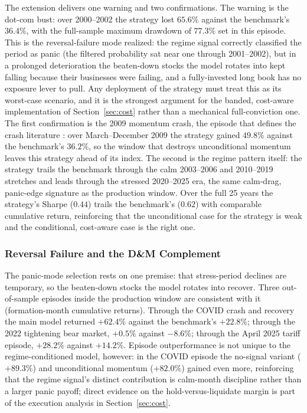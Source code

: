 The extension delivers one warning and two confirmations. The warning is the dot-com bust: over 2000--2002 the strategy lost $65.6\%$ against the benchmark's $36.4\%$, with the full-sample maximum drawdown of $77.3\%$ set in this episode. This is the reversal-failure mode realized: the regime signal correctly classified the period as panic (the filtered probability sat near one through 2001--2002), but in a prolonged deterioration the beaten-down stocks the model rotates into kept falling because their businesses were failing, and a fully-invested long book has no exposure lever to pull. Any deployment of the strategy must treat this as its worst-case scenario, and it is the strongest argument for the banded, cost-aware implementation of Section~\ref{sec:cost} rather than a mechanical full-conviction one. The first confirmation is the 2009 momentum crash, the episode that defines the crash literature \citep{DanielMoskowitz2016}: over March--December 2009 the strategy gained $49.8\%$ against the benchmark's $36.2\%$, so the window that destroys unconditional momentum leaves this strategy ahead of its index. The second is the regime pattern itself: the strategy trails the benchmark through the calm 2003--2006 and 2010--2019 stretches and leads through the stressed 2020--2025 era, the same calm-drag, panic-edge signature as the production window. Over the full 25 years the strategy's Sharpe ($0.44$) trails the benchmark's ($0.62$) with comparable cumulative return, reinforcing that the unconditional case for the strategy is weak and the conditional, cost-aware case is the right one.

\subsubsection{Reversal Failure and the D\&M Complement}\label{sec:stress_test}

The panic-mode selection rests on one premise: that stress-period declines are temporary, so the beaten-down stocks the model rotates into recover. Three out-of-sample episodes inside the production window are consistent with it (formation-month cumulative returns). Through the COVID crash and recovery the main model returned $+62.4\%$ against the benchmark's $+22.8\%$; through the 2022 tightening bear market, $+0.5\%$ against $-8.6\%$; through the April 2025 tariff episode, $+28.2\%$ against $+14.2\%$. Episode outperformance is not unique to the regime-conditioned model, however: in the COVID episode the no-signal variant ($+89.3\%$) and unconditional momentum ($+82.0\%$) gained even more, reinforcing that the regime signal's distinct contribution is calm-month discipline rather than a larger panic payoff; direct evidence on the hold-versus-liquidate margin is part of the execution analysis in Section~\ref{sec:cost}.

